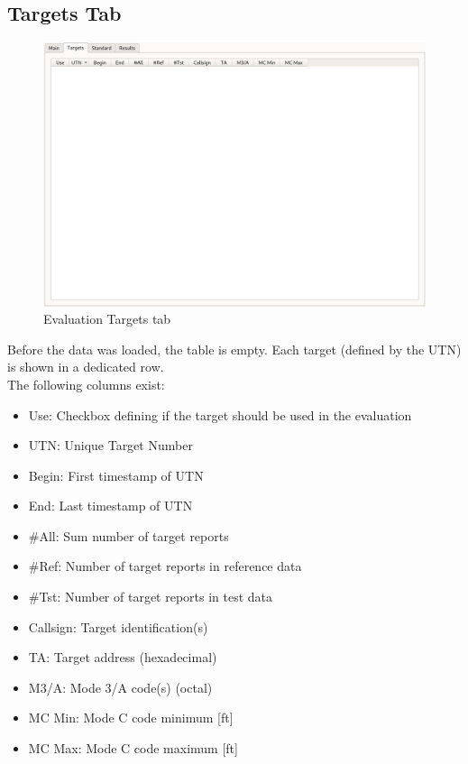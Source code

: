 \subsection{Targets Tab}

\begin{figure}[H]
  \hspace*{-2cm}
    \includegraphics[width=18cm,frame]{../screenshots/eval_targets_empty.png}
  \caption{Evaluation Targets tab}
\end{figure}

Before the data was loaded, the table is empty. Each target (defined by the UTN) is shown in a dedicated row. \\

The following columns exist:

\begin{itemize}  
\item Use: Checkbox defining if the target should be used in the evaluation
\item UTN: Unique Target Number
\item Begin: First timestamp of UTN
\item End: Last timestamp of UTN
\item \#All: Sum number of target reports
\item \#Ref: Number of target reports in reference data
\item \#Tst: Number of target reports in test data
\item Callsign: Target identification(s)
\item TA: Target address (hexadecimal)
\item M3/A: Mode 3/A code(s) (octal)
\item MC Min: Mode C code minimum [ft]
\item MC Max: Mode C code maximum [ft]
\end{itemize}
\ \\

